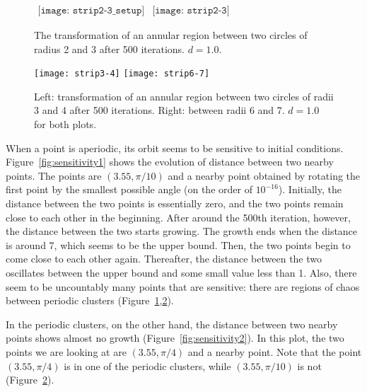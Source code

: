 \documentclass[10pt,twoside]{book}
\begin{document}
\begin{figure}[p]
  \begin{center}
    $
    \begin{array}{l}
      \texttt{[image: strip2-3\_setup]}
    \end{array}
    $\scalebox{1.75}{$\Rar$}$
    \begin{array}{l}
      \texttt{[image: strip2-3]}
    \end{array}
    $
    \caption{
      The transformation of an annular region between two circles of radius 2 and 3 after 500 iterations.
      $d = 1.0$.
    }
    \label{fig:strip2-3}
  \end{center}
\end{figure}

\begin{figure}[p]
  \begin{center}
    \texttt{[image: strip3-4]}
    \texttt{[image: strip6-7]}
    \caption{Left: transformation of an annular region between two circles of radii 3 and 4 after 500 iterations.
      Right: between radii 6 and 7.
      $d = 1.0$ for both plots.
    }
    \label{fig:strip3-4-6-7}
  \end{center}
\end{figure}

When a point is aperiodic, its orbit seems to be sensitive to initial conditions.
Figure~\ref{fig:sensitivity1} shows the evolution of distance between two nearby points.
The points are $(3.55,\pi/10)$ and a nearby point obtained by rotating the first point by the smallest possible angle (on the order of $10^{-16}$).
Initially, the distance between the two points is essentially zero, and the two points remain close to each other in the beginning.
After around the 500th iteration, however, the distance between the two starts growing.
The growth ends when the distance is around 7, which seems to be the upper bound.
Then, the two points begin to come close to each other again.
Thereafter, the distance between the two oscillates between the upper bound and some small value less than 1.
Also, there seem to be uncountably many points that are sensitive: there are regions of chaos between periodic clusters (Figure~\ref{fig:strip2-3},\ref{fig:strip3-4-6-7}).

In the periodic clusters, on the other hand, the distance between two nearby points shows almost no growth (Figure~\ref{fig:sensitivity2}).
In this plot, the two points we are looking at are $(3.55,\pi/4)$ and a nearby point.
Note that the point $(3.55,\pi/4)$ is in one of the periodic clusters, while $(3.55,\pi/10)$ is not (Figure~\ref{fig:strip3-4-6-7}).
\end{document}
